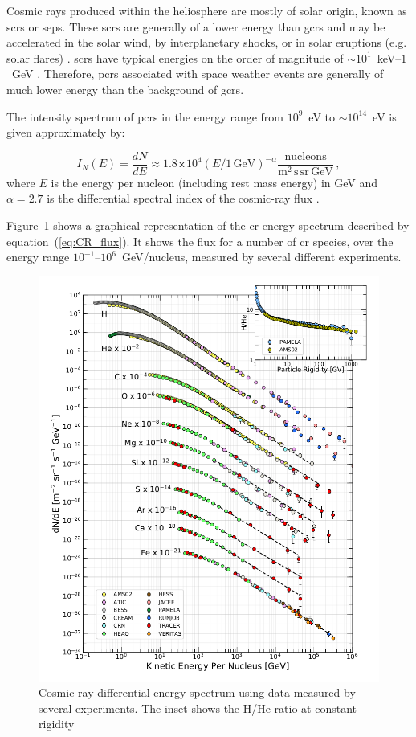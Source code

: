 Cosmic rays produced within the heliosphere are mostly of solar origin, known as \glspl{scr} or \glspl{sep}. These \glspl{scr} are generally of a lower energy than \glspl{gcr} and may be accelerated in the solar wind, by interplanetary shocks, or in solar eruptions (e.g. solar flares) \citep{giacalone_energetic_2010}. \glspl{scr} have typical energies on the order of magnitude of $\sim10^{1}$~keV--$1$~GeV \citep{chilingarian_galactic_2003, bruno_solar_2018}. Therefore, \glspl{pcr} associated with space weather events are generally of much lower energy than the background of \glspl{gcr}.

The intensity spectrum of \glspl{pcr} in the energy range from $10^9$~eV to $\sim10^{14}$~eV is given approximately by:

\begin{equation}
\label{eq:CR_flux}
I_N(E) = \frac{dN}{dE} \approx 1.8 \, \mathsf{x} \, 10^4 (E/1 \, \mathrm{GeV})^{-\alpha} \frac{\mathrm{nucleons}}{{\mathrm{m^2 \, s  \, sr \, GeV}}} \, ,
\end{equation}
%
where $E$ is the energy per nucleon (including rest mass energy) in GeV and $\alpha=2.7$ is the differential spectral index of the cosmic-ray flux \citep{particle_data_group_review_2020}. 

Figure~\ref{fig:CR_spec} shows a graphical representation of the \gls{cr} energy spectrum described by equation~(\ref{eq:CR_flux}). It shows the flux for a number of \gls{cr} species, over the energy range $10^{-1}$--$10^{6}$~GeV/nucleus, measured by several different experiments.

\begin{figure}[ht!]
	\centering
	\includegraphics[width=0.8\columnwidth]{CR_spectrum.png}
	\caption{ Cosmic ray differential energy spectrum using data measured by several experiments. The inset shows the H/He ratio at constant rigidity \citep{particle_data_group_review_2020} }
	\label{fig:CR_spec}
\end{figure}

